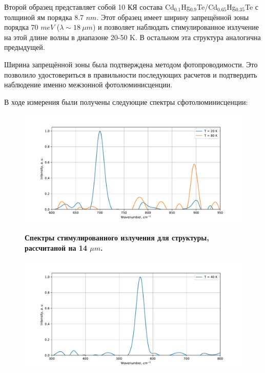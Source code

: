 \documentclass[../main.tex]{subfiles}
\begin{document}
    Второй образец представляет собой 10 КЯ состава Cd${}_{0.1}$Hg${}_{0.9}$Te/Cd${}_{0.65}$Hg${}_{0.35}$Te
    с толщиной ям порядка 8.7 $nm$.
    Этот образец имеет ширину запрещённой зоны порядка 70 $meV$ ($\lambda \sim 18~\mu m$) и позволяет наблюдать стимулированное 
    излучение на этой длине волны в диапазоне  20-50 K. В остальном эта структура аналогична предыдущей.

    Ширина запрещённой зоны была подтверждена методом фотопроводимости. Это позволило удостовериться в правильности последующих 
    расчетов и подтвердить наблюдение именно межзонной фотолюминисценции.

    В ходе измерения были получены следующие спектры сфотолюминисценции:

    \begin{figure}[h]
        \vspace{0.75cm}
        \begin{minipage}[h]{\linewidth}
            \begin{center}
                \includegraphics[width=0.75\linewidth]{./images/new_f_sp_14um.pdf}

                \vspace{0.75cm}
                \textbf{Спектры стимулированного излучения для структуры, 
                    рассчитаной на 14 $\mu m$.}
                \vspace{0.75cm}
            \end{center}
        \end{minipage}
        \begin{minipage}[h]{\linewidth}
            \begin{center}
                \includegraphics[width=0.75\linewidth]{./images/new_f_sp_18um.pdf}


\end{center}
\end{minipage}
\end{figure}
\end{document}
